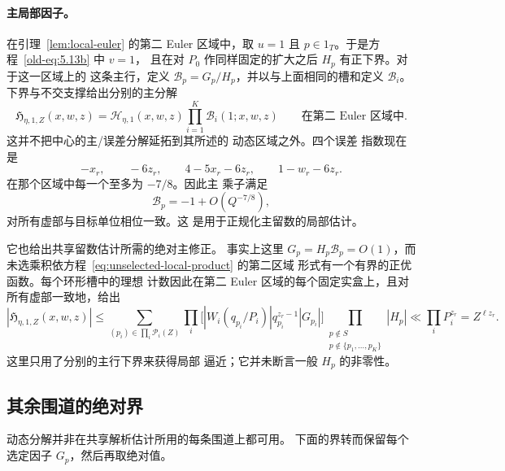 \documentclass[11pt,a4paper]{article}
\numberwithin{equation}{section}
\numberwithin{figure}{section}
\theoremstyle{definition}
\theoremstyle{remark}
\begin{document}
\paragraph{主局部因子。}
在引理~\ref{lem:local-euler} 的第二 Euler 区域中，取
$u=1$ 且 $p\in1_T$。于是方程~\eqref{old-eq:5.13b} 中 $v=1$，
且在对 $P_0$ 作同样固定的扩大之后 $H_p$ 有正下界。对于这一区域上的
这条主行，定义 $\mathcal B_p=G_p/H_p$，并以与上面相同的槽和定义
$\mathcal B_i$。下界与不交支撑给出分别的主分解
\begin{equation}\label{eq:principal-slot-factorization}
 \mathfrak H_{\eta,1,Z}(x,w,z)
 =\mathcal H_{\eta,1}(x,w,z)\prod_{i=1}^K\mathcal B_i(1;x,w,z)
 \qquad\text{在第二 Euler 区域中}.
\end{equation}
这并不把中心的主/误差分解延拓到其所述的
动态区域之外。四个误差
指数现在是
\[
 -x_r,\qquad -6z_r,\qquad 4-5x_r-6z_r,
       \qquad 1-w_r-6z_r.
\]
在那个区域中每一个至多为 $-7/8$。因此主
乘子满足
\begin{equation}\label{eq:principal-local-approximation}
 \mathcal B_p=-1+O(Q^{-7/8}),
\end{equation}
对所有虚部与目标单位相位一致。这
是用于正规化主留数的局部估计。

它也给出共享留数估计所需的绝对主修正。
事实上这里 $G_p=H_p\mathcal B_p=O(1)$，而
未选乘积依方程~\eqref{eq:unselected-local-product} 的第二区域
形式有一个有界的正优函数。每个环形槽中的理想
计数因此在第二 Euler 区域的每个固定实盒上，且对所有虚部一致地，给出
\begin{equation}\label{eq:principal-local-tuple-bound}
 |\mathfrak H_{\eta,1,Z}(x,w,z)|
 \le\sum_{(p_i)\in\prod_i\mathcal P_i(Z)}
       \prod_i\bigl[|W_i(q_{p_i}/P_i)|q_{p_i}^{z_r-1}|G_{p_i}|\bigr]
       \prod_{\substack{p\notin S\\p\notin\{p_1,\ldots,p_K\}}}|H_p|
 \ll \prod_iP_i^{z_r}=Z^{\ell z_r}.
\end{equation}
这里只用了分别的主行下界来获得局部
逼近；它并未断言一般 $H_p$ 的非零性。

\subsection{其余围道的绝对界}

动态分解并非在共享解析估计所用的每条围道上都可用。
下面的界转而保留每个
选定因子 $G_p$，然后再取绝对值。
\end{document}
